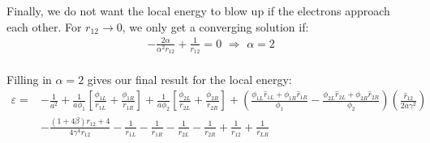 Finally, we do not want the local energy to blow up if the electrons approach each other. For $r_{12}\rightarrow0$, we only get a converging solution if:
\begin{align}
 - \frac{{2\alpha }}{{{\alpha ^2}{r_{12}}}} + \frac{1}{{{r_{12}}}} = 0\,\, \Rightarrow \,\,\alpha  = 2
\end{align}\\
Filling in $\alpha=2$ gives our final result for the local energy:
\begin{align}
\varepsilon  =&  - \frac{1}{{{a^2}}} + \frac{1}{{a{\phi _1}}}\left[ {\frac{{{\phi _{1L}}}}{{{r_{1L}}}} + \frac{{{\phi _{1R}}}}{{{r_{1R}}}}} \right] + \frac{1}{{a{\phi _2}}}\left[ {\frac{{{\phi _{2L}}}}{{{r_{2L}}}} + \frac{{{\phi _{2R}}}}{{{r_{2R}}}}} \right] + \left( {\frac{{{\phi _{1L}}{{\hat r}_{1L}} + {\phi _{1R}}{{\hat r}_{1R}}}}{{{\phi _1}}} - \frac{{{\phi _{2L}}{{\hat r}_{2L}} + {\phi _{2R}}{{\hat r}_{2R}}}}{{{\phi _2}}}} \right)\left( {\frac{{{{\hat r}_{12}}}}{{2a{\gamma ^2}}}} \right)\nonumber\\
 &- \frac{{\left( {1 + 4\beta } \right){r_{12}} + 4}}{{4{\gamma ^4}{r_{12}}}} - \frac{1}{{{r_{1L}}}} - \frac{1}{{{r_{1R}}}} - \frac{1}{{{r_{2L}}}} - \frac{1}{{{r_{2R}}}} + \frac{1}{{{r_{12}}}} + \frac{1}{{{r_{LR}}}}
\end{align}\\